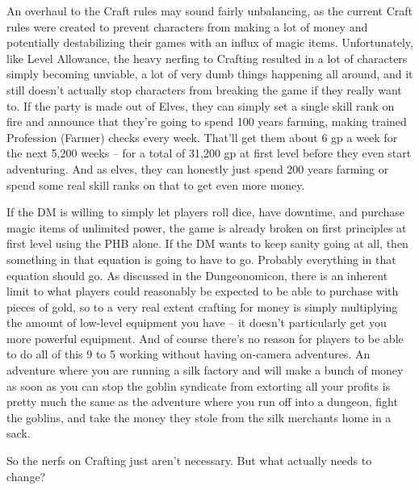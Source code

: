 An overhaul to the Craft rules may sound fairly unbalancing, as the current Craft rules were created to prevent characters from making a lot of money and potentially destabilizing their games with an influx of magic items. Unfortunately, like Level Allowance, the heavy nerfing to Crafting resulted in a lot of characters simply becoming unviable, a lot of very dumb things happening all around, and it still doesn't actually stop characters from breaking the game if they really want to. If the party is made out of Elves, they can simply set a single skill rank on fire and announce that they're going to spend 100 years farming, making trained Profession (Farmer) checks every week. That'll get them about 6 gp a week for the next 5,200 weeks -- for a total of 31,200 gp at first level before they even start adventuring. And as elves, they can honestly just spend 200 years farming or spend some real skill ranks on that to get even more money.

If the DM is willing to simply let players roll dice, have downtime, and purchase magic items of unlimited power, the game is already broken on first principles at first level using the PHB alone. If the DM wants to keep sanity going at all, then something in that equation is going to have to go. Probably everything in that equation should go. As discussed in the Dungeonomicon, there is an inherent limit to what players could reasonably be expected to be able to purchase with pieces of gold, so to a very real extent crafting for money is simply multiplying the amount of low-level equipment you have -- it doesn't particularly get you more powerful equipment. And of course there's no reason for players to be able to do all of this 9 to 5 working without having on-camera adventures. An adventure where you are running a silk factory and will make a bunch of money as soon as you can stop the goblin syndicate from extorting all your profits is pretty much the same as the adventure where you run off into a dungeon, fight the goblins, and take the money they stole from the silk merchants home in a sack.

So the nerfs on Crafting just aren't necessary. But what actually needs to change?

